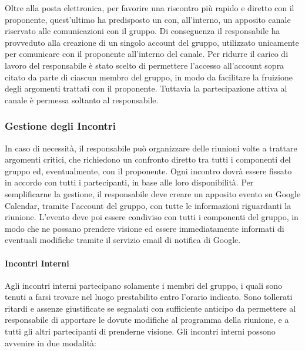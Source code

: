 				Oltre alla posta elettronica, per favorire una riscontro più rapido e diretto con il proponente, quest'ultimo ha predisposto un   con, all'interno, un apposito canale riservato alle comunicazioni con il gruppo. Di conseguenza il responsabile ha provveduto alla creazione di un singolo account  del gruppo, utilizzato unicamente per comunicare con il proponente all'interno del canale. Per ridurre il carico di lavoro del responsabile è stato scelto di permettere l'accesso all'account sopra citato da parte di ciascun membro del gruppo, in modo da facilitare la fruizione degli argomenti trattati con il proponente. Tuttavia la partecipazione attiva al canale è permessa soltanto al responsabile.

		\subsubsection{Gestione degli Incontri}

			In caso di necessità, il responsabile può organizzare delle riunioni volte a trattare argomenti critici, che richiedono un confronto diretto tra tutti i componenti del gruppo ed, eventualmente, con il proponente.
			\newline
			Ogni incontro dovrà essere fissato in accordo con tutti i partecipanti, in base alle loro disponibilità. Per semplificarne la gestione, il responsabile deve creare un apposito evento su Google Calendar, tramite l'account del gruppo, con tutte le informazioni riguardanti la riunione. L'evento deve poi essere condiviso con tutti i componenti del gruppo, in modo che ne possano prendere visione ed essere immediatamente informati di eventuali modifiche tramite il servizio email di notifica di Google.
			
			\paragraph{Incontri Interni}

				Agli incontri interni partecipano solamente i membri del gruppo, i quali sono tenuti a farsi trovare nel luogo prestabilito entro l'orario indicato.
				\newline
				Sono tollerati ritardi e assenze giustificate se segnalati con sufficiente anticipo da permettere al responsabile di apportare le dovute modifiche al programma della riunione, e a tutti gli altri partecipanti di prenderne visione.
				\newline
				Gli incontri interni possono avvenire in due modalità:
				
